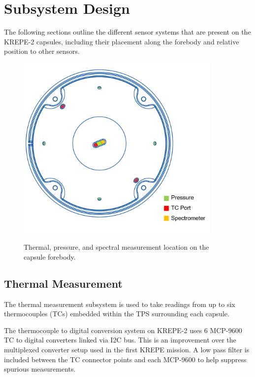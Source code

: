 \documentclass{article}
\begin{document}
\section{Subsystem Design}
\label{sec:subsystems}

The following sections outline the different sensor systems that are present on the KREPE-2 capsules, including their placement along the forebody and relative position to other sensors. 

\begin{figure}
\centering
\includegraphics[width=10cm]{images/tps_cad_highlight}
\label{fig:sensor-locations}
\caption{Thermal, pressure, and spectral measurement location on the capsule forebody.}
\end{figure}

\subsection{Thermal Measurement}
The thermal measurement subsystem is used to take readings from up to six thermocouples (TCs) embedded within the TPS surrounding each capsule. 

The thermocouple to digital conversion system on KREPE-2 uses 6 MCP-9600 TC to digital converters linked via I2C bus. This is an improvement over the multiplexed converter setup used in the first KREPE mission. A low pass filter is included between the TC connector points and each MCP-9600 to help suppress spurious measurements.
\end{document}
